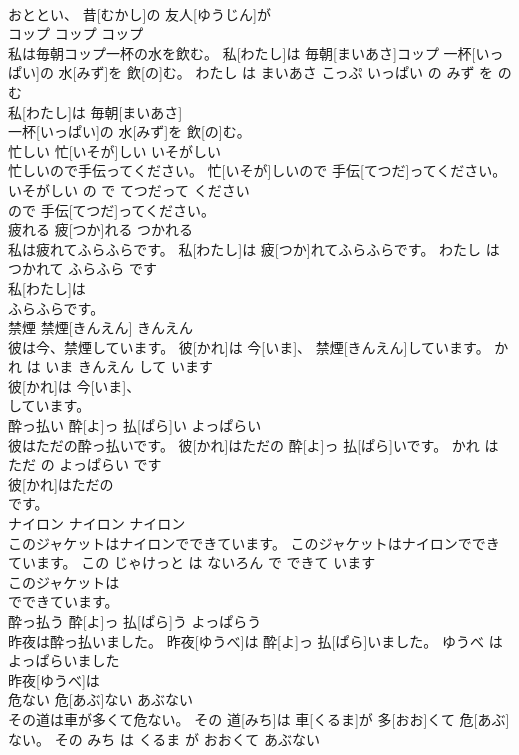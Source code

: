 \documentclass[8pt]{extreport}
\begin{document}
\begin{CJK}{UTF8}{min}
\\	おととい、 昔[むかし]の 友人[ゆうじん]が
\\	コップ	コップ	コップ	
\\	私は毎朝コップ一杯の水を飲む。	私[わたし]は 毎朝[まいあさ]コップ 一杯[いっぱい]の 水[みず]を 飲[の]む。	わたし は まいあさ こっぷ いっぱい の みず を のむ	
\\	私[わたし]は 毎朝[まいあさ]
\\	一杯[いっぱい]の 水[みず]を 飲[の]む。			
\\	忙しい	忙[いそが]しい	いそがしい	
\\	忙しいので手伝ってください。	忙[いそが]しいので 手伝[てつだ]ってください。	いそがしい の で てつだって ください	
\\	ので 手伝[てつだ]ってください。			
\\	疲れる	疲[つか]れる	つかれる	
\\	私は疲れてふらふらです。	私[わたし]は 疲[つか]れてふらふらです。	わたし は つかれて ふらふら です	
\\	私[わたし]は
\\	ふらふらです。			
\\	禁煙	禁煙[きんえん]	きんえん	
\\	彼は今、禁煙しています。	彼[かれ]は 今[いま]、 禁煙[きんえん]しています。	かれ は いま きんえん して います	
\\	彼[かれ]は 今[いま]、
\\	しています。			
\\	酔っ払い	酔[よ]っ 払[ぱら]い	よっぱらい	
\\	彼はただの酔っ払いです。	彼[かれ]はただの 酔[よ]っ 払[ぱら]いです。	かれ は ただ の よっぱらい です	
\\	彼[かれ]はただの
\\	です。			
\\	ナイロン	ナイロン	ナイロン	
\\	このジャケットはナイロンでできています。	このジャケットはナイロンでできています。	この じゃけっと は ないろん で できて います	
\\	このジャケットは
\\	でできています。			
\\	酔っ払う	酔[よ]っ 払[ぱら]う	よっぱらう	
\\	昨夜は酔っ払いました。	昨夜[ゆうべ]は 酔[よ]っ 払[ぱら]いました。	ゆうべ は よっぱらいました	
\\	昨夜[ゆうべ]は
\\	危ない	危[あぶ]ない	あぶない	
\\	その道は車が多くて危ない。	その 道[みち]は 車[くるま]が 多[おお]くて 危[あぶ]ない。	その みち は くるま が おおくて あぶない	

\end{CJK}
\end{document}
